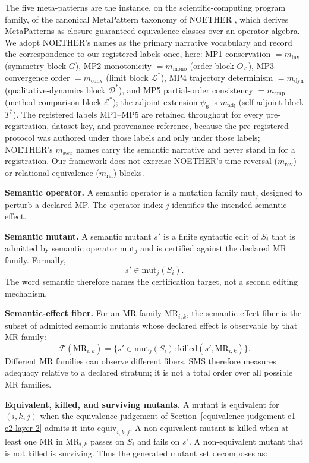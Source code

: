 \documentclass[manuscript,screen,review]{acmart}
\begin{document}
The five meta-patterns are the instance, on the scientific-computing program
family, of the canonical MetaPattern taxonomy of NOETHER \citep{noether2026},
which derives MetaPatterns as closure-guaranteed equivalence classes over an
operator algebra. We adopt NOETHER's names as the primary narrative vocabulary
and record the correspondence to our registered labels once, here:
MP1 conservation \(= m_{\mathrm{inv}}\) (symmetry block \(G\)),
MP2 monotonicity \(= m_{\mathrm{mono}}\) (order block \(O_{\le}\)),
MP3 convergence order \(= m_{\mathrm{conv}}\) (limit block \(\mathcal{L}^{*}\)),
MP4 trajectory determinism \(= m_{\mathrm{dyn}}\) (qualitative-dynamics block
\(\mathcal{D}^{*}\)), and MP5 partial-order consistency \(= m_{\mathrm{cmp}}\)
(method-comparison block \(\mathcal{E}^{*}\)); the adjoint extension \(\psi_6\)
is \(m_{\mathrm{adj}}\) (self-adjoint block \(T^{*}\)). The registered labels
MP1--MP5 are retained throughout for every pre-registration, dataset-key, and
provenance reference, because the pre-registered protocol was authored under
those labels and only under those labels; NOETHER's \(m_{xxx}\) names carry the
semantic narrative and never stand in for a registration. Our framework does
not exercise NOETHER's time-reversal (\(m_{\mathrm{rev}}\)) or
relational-equivalence (\(m_{\mathrm{rel}}\)) blocks.

\textbf{Semantic operator.} A semantic operator is a mutation family
\(\mathrm{mut}_j\) designed to perturb a declared MP. The operator index
\(j\) identifies the intended semantic effect.

\textbf{Semantic mutant.} A semantic mutant \(s'\) is a finite syntactic
edit of \(S_i\) that is admitted by semantic operator \(\mathrm{mut}_j\)
and is certified against the declared MR family. Formally,
\[
  s' \in \mathrm{mut}_j(S_i).
\]
The word semantic therefore names the certification target, not a second
editing mechanism.

\textbf{Semantic-effect fiber.} For an MR family \(\mathrm{MR}_{i,k}\),
the semantic-effect fiber is the subset of admitted semantic mutants
whose declared effect is observable by that MR family:
\[
  \mathcal{F}(\mathrm{MR}_{i,k}) =
  \{s' \in \mathrm{mut}_j(S_i): \mathrm{killed}(s', \mathrm{MR}_{i,k})\}.
\]
Different MR families can observe different fibers. SMS therefore
measures adequacy relative to a declared stratum; it is not a total order
over all possible MR families.

\textbf{Equivalent, killed, and surviving mutants.} A mutant is
equivalent for \((i,k,j)\) when the equivalence judgement of Section~\ref{equivalence-judgement-e1-e2-layer-2} admits
it into \(\mathrm{equiv}_{i,k,j}\). A non-equivalent mutant is killed when
at least one MR in \(\mathrm{MR}_{i,k}\) passes on \(S_i\) and fails on
\(s'\). A non-equivalent mutant that is not killed is surviving. Thus
the generated mutant set decomposes as:
\end{document}
